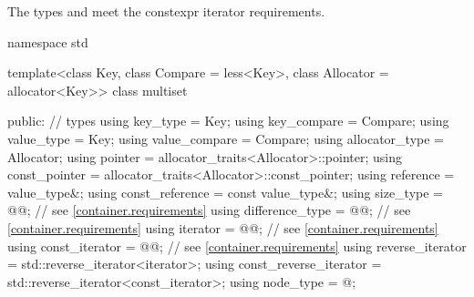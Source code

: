 \pnum
The types  and  meet
the constexpr iterator requirements.

\begin{codeblock}
namespace std {
  template<class Key, class Compare = less<Key>,
           class Allocator = allocator<Key>>
  class multiset {
  public:
    // types
    using key_type               = Key;
    using key_compare            = Compare;
    using value_type             = Key;
    using value_compare          = Compare;
    using allocator_type         = Allocator;
    using pointer                = allocator_traits<Allocator>::pointer;
    using const_pointer          = allocator_traits<Allocator>::const_pointer;
    using reference              = value_type&;
    using const_reference        = const value_type&;
    using size_type              = @@; // see \ref{container.requirements}
    using difference_type        = @@; // see \ref{container.requirements}
    using iterator               = @@; // see \ref{container.requirements}
    using const_iterator         = @@; // see \ref{container.requirements}
    using reverse_iterator       = std::reverse_iterator<iterator>;
    using const_reverse_iterator = std::reverse_iterator<const_iterator>;
    using node_type              = @\unspec@;

}}
\end{codeblock}

